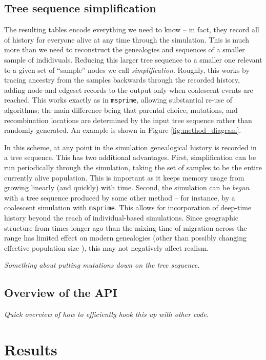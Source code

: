 \documentclass{article}
\newcommand{\msprime}{\texttt{msprime}}
\newcommand{\plr}[1]{{\em \color{blue} #1}}
\begin{document}
\subsection*{Tree sequence simplification}

The resulting tables encode everything we need to know --
in fact, they record all of history for everyone alive at any time through the simulation.
This is much more than we need to reconstruct the genealogies and sequences
of a smaller sample of indidivuals.
Reducing this larger tree sequence to a smaller one relevant to a given set of ``sample'' nodes
we call \emph{simplification}.
Roughly, this works by tracing ancestry from the samples backwards through the recorded history,
adding node and edgeset records to the output only when coalescent events are reached.
This works exactly as in \msprime, allowing substantial re-use of algorithms;
the main difference being that parental choice, mutations, and recombination locations
are determined by the input tree sequence
rather than randomly generated.
An example is shown in Figure \ref{fig:method_diagram}.

In this scheme,
at any point in the simulation genealogical history is recorded in a tree sequence.
This has two additional advantages.
First, simplification can be run periodically through the simulation,
taking the set of samples to be the entire currently alive population.
This is important as it keeps memory usage from growing linearly (and quickly) with time.
Second, the simulation can be \emph{begun} with a tree sequence produced by some other method --
for instance, by a coalescent simulation with \msprime.
This allows for incorporation of deep-time history beyond the reach of individual-based simulations.
Since geographic structure from times longer ago than the mixing time of migration across the range
has limited effect on modern genealogies \citep{wilkins_separation}
(other than possibly changing effective population size \citet{durretspatial}),
this may not negatively affect realism.

\plr{Something about putting mutations down on the tree sequence.}

\subsection*{Overview of the API}

\plr{Quick overview of how to efficiently hook this up with other code.}


\section*{Results}
\end{document}
